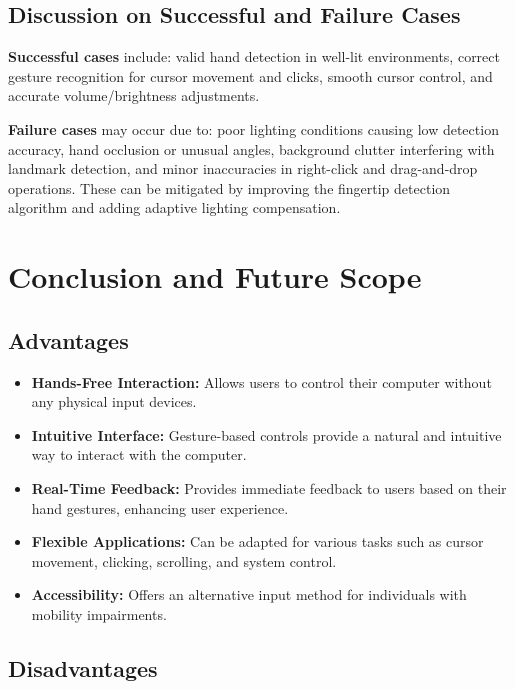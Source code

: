 \documentclass[12pt,a4paper]{report}
\begin{document}
\begin{enumerate}
\section{Discussion on Successful and Failure Cases}

\textbf{Successful cases} include: valid hand detection in well-lit environments, correct
gesture recognition for cursor movement and clicks, smooth cursor control, and accurate
volume/brightness adjustments.

\textbf{Failure cases} may occur due to: poor lighting conditions causing low detection
accuracy, hand occlusion or unusual angles, background clutter interfering with landmark
detection, and minor inaccuracies in right-click and drag-and-drop operations. These can be
mitigated by improving the fingertip detection algorithm and adding adaptive lighting
compensation.

\chapter{Conclusion and Future Scope}

\section{Advantages}

\begin{itemize}[noitemsep]
  \item \textbf{Hands-Free Interaction:} Allows users to control their computer without any
    physical input devices.
  \item \textbf{Intuitive Interface:} Gesture-based controls provide a natural and intuitive
    way to interact with the computer.
  \item \textbf{Real-Time Feedback:} Provides immediate feedback to users based on their hand
    gestures, enhancing user experience.
  \item \textbf{Flexible Applications:} Can be adapted for various tasks such as cursor
    movement, clicking, scrolling, and system control.
  \item \textbf{Accessibility:} Offers an alternative input method for individuals with
    mobility impairments.
\end{itemize}

\section{Disadvantages}


\end{enumerate}
\end{document}
